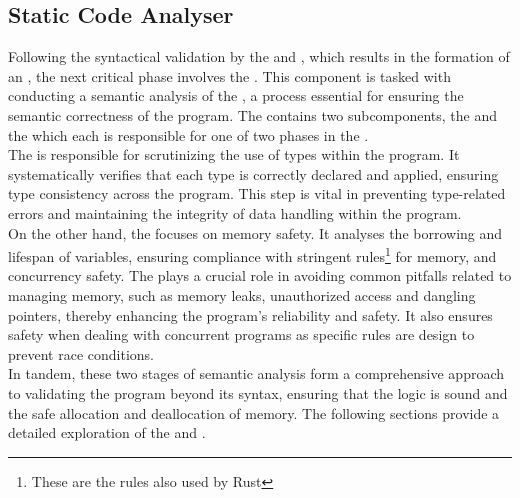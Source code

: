 \subsection{Static Code Analyser}

Following the syntactical validation by the \lexer{} and \parser{}, which results in
the formation of an \ast{}, the next critical phase involves the \static{}. This
component is tasked with conducting a semantic analysis of the \ast{}, a process
essential for ensuring the semantic correctness of the program. The \static{}
contains two subcomponents, the \typeChecker{} and the \borrowChecker{} which each is
responsible for one of two phases in the \static.\\

The \typeChecker{} is responsible for scrutinizing the use of types within the
program. It systematically verifies that each type is correctly declared and applied,
ensuring type consistency across the program. This step is vital in preventing
type-related errors and maintaining the integrity of data handling within the
program. \\

On the other hand, the \borrowChecker{} focuses on memory safety. It analyses the
borrowing and lifespan of variables, ensuring compliance with stringent
rules\footnote{These are the rules also used by Rust} for memory, and concurrency
safety\cite{RUST}. The \borrowChecker{} plays a crucial role in avoiding common
pitfalls related to managing memory, such as memory leaks, unauthorized access and
dangling pointers, thereby enhancing the program's reliability and safety. It also
ensures safety when dealing with concurrent programs as specific rules are design to
prevent race conditions.\\

In tandem, these two stages of semantic analysis form a comprehensive approach to
validating the program beyond its syntax, ensuring that the logic is sound and the
safe allocation and deallocation of memory. The following sections provide a detailed
exploration of the \typeChecker{} and \borrowChecker.



